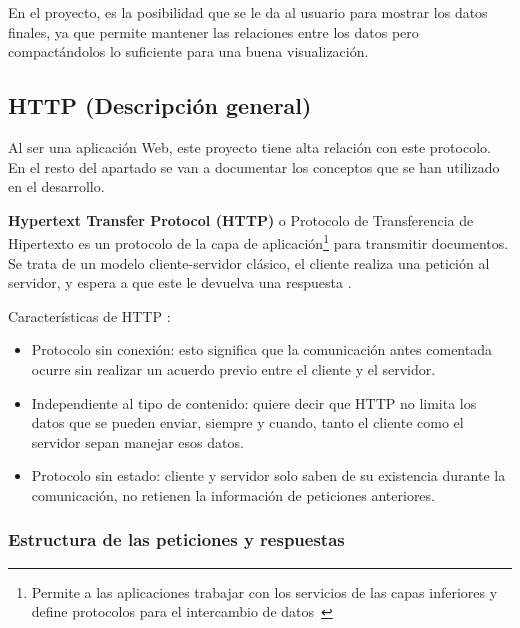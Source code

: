 En el proyecto, es la posibilidad que se le da al usuario para mostrar los datos
finales, ya que permite mantener las relaciones entre los datos pero
compactándolos lo suficiente para una buena visualización.

\subsection{HTTP (Descripción general)}

Al ser una aplicación Web, este proyecto tiene alta relación con este protocolo.
En el resto del apartado se van a documentar los conceptos que se han utilizado
en el desarrollo.

\textbf{Hypertext Transfer Protocol (HTTP)} o Protocolo de Transferencia de
Hipertexto es un protocolo de la capa de aplicación\footnote{Permite a las
aplicaciones trabajar con los servicios de las capas inferiores y define
protocolos para el intercambio de datos~\cite{eswiki:149372346}} para transmitir
documentos. Se trata de un modelo cliente-servidor clásico, el cliente realiza
una petición al servidor, y espera a que este le devuelva una respuesta
\cite{http:mdn}.



Características de HTTP \cite{http:features}:
\begin{itemize}
	\item Protocolo sin conexión: esto significa que la comunicación antes
	comentada ocurre sin realizar un acuerdo previo entre el cliente y el
	servidor.
	\item Independiente al tipo de contenido: quiere decir que HTTP no limita
	los datos que se pueden enviar, siempre y cuando, tanto el cliente como el
	servidor sepan manejar esos datos.
	\item Protocolo sin estado: cliente y servidor solo saben de su existencia
	durante la comunicación, no retienen la información de peticiones
	anteriores.
\end{itemize}


\subsubsection{Estructura de las peticiones y respuestas}

